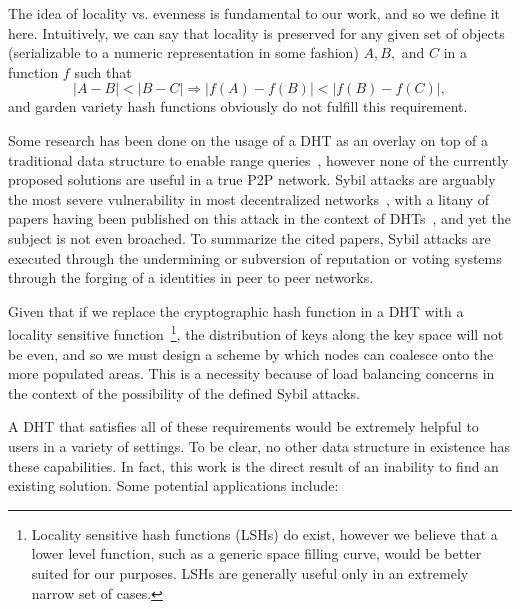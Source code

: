 \documentclass[10pt]{IEEEtran}
\begin{document}
The idea of locality vs. evenness is fundamental to our work, and so we define it here. Intuitively, we can say that locality is preserved for any given set of objects (serializable to a numeric representation in some fashion) $A,B,$ and $C$ in a function $f$ such that
\begin{equation} \label{eq:locality}
|A-B| < |B-C| \Rightarrow |f(A)-f(B)| < |f(B) - f(C)|,
\end{equation}
and garden variety hash functions obviously do not fulfill this requirement.

\par Some research has been done on the usage of a DHT as an overlay on top of a traditional data structure to enable range queries~\cite{Ramabhadran:2004tr,Desnoyers:2008uo}, however none of the currently proposed solutions are useful in a true P2P network. Sybil attacks are arguably the most severe vulnerability in most decentralized networks~\cite{Douceur:2002jr}, with a litany of papers having been published on this attack in the context of DHTs~\cite{LesniewskiLass:2010ue}, and yet the subject is not even broached. To summarize the cited papers, Sybil attacks are executed through the undermining or subversion of reputation or voting systems through the forging of a identities in peer to peer networks.

\par Given that if we replace the cryptographic hash function in a DHT with a locality sensitive function~\footnote{Locality sensitive hash functions (LSHs) do exist, however we believe that a lower level function, such as a generic space filling curve, would be better suited for our purposes. LSHs are generally useful only in an extremely narrow set of cases.}, the distribution of keys along the key space will not be even, and so we must design a scheme by which nodes can coalesce onto the more populated areas. This is a necessity because of load balancing concerns in the context of the possibility of the defined Sybil attacks.

\par A DHT that satisfies all of these requirements would be extremely helpful to users in a variety of settings. To be clear, no other data structure in existence has these capabilities. In fact, this work is the direct result of an inability to find an existing solution. Some potential applications include:
\end{document}
